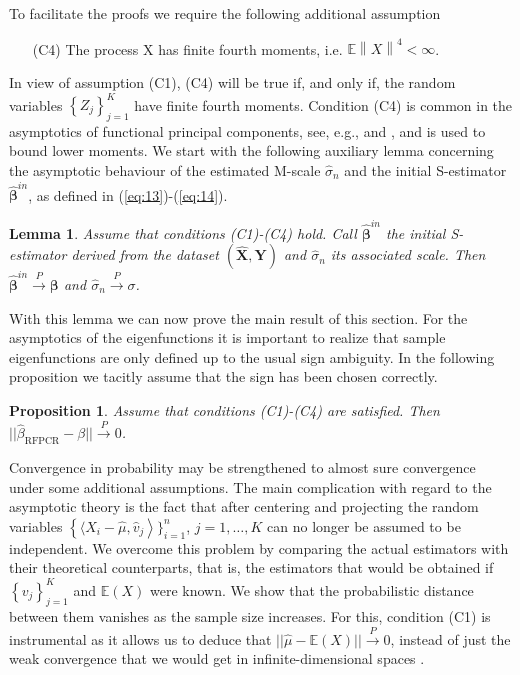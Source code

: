 \documentclass[11pt]{article}
\newtheorem{prop}{Proposition}[section]
\newtheorem{lem}{Lemma}[section]
\begin{document}
To facilitate the proofs we require the following additional assumption

\begin{itemize}
\item[(C4)] The process X has finite fourth moments, i.e. $\mathbb{E} \left\|X \right\|^4 < \infty$.
\end{itemize}
In view of assumption (C1), (C4) will be true if, and only if, the random variables $\left\{Z_j \right\}_{j=1}^K$ have finite fourth moments. Condition (C4) is common in the asymptotics of functional principal components, see, e.g., \citet[Chapter ~2]{horvath2012inference} and \cite{hall2007methodology}, and is used to bound lower moments. We start with the following auxiliary lemma concerning the asymptotic behaviour of the estimated M-scale $\widehat{\sigma}_n$ and the initial S-estimator $\boldsymbol{\widehat{\beta}}^{in}$, as defined in (\ref{eq:13})-(\ref{eq:14}).

\begin{lem}
Assume that conditions (C1)-(C4) hold. Call $\widehat{\boldsymbol{\beta}}^{in}$ the initial S-estimator derived from the dataset $ (\mathbf{\widehat{X}}, \mathbf{Y})$ and $\widehat{\sigma}_n$ its associated scale. Then $\widehat{\boldsymbol{\beta}}^{in} \xrightarrow{P} \boldsymbol{\beta}$ and $\widehat{\sigma}_n \xrightarrow{P} \sigma$.  
\end{lem}
With this lemma we can now prove the main result of this section. For the asymptotics of the eigenfunctions it is important to realize that sample eigenfunctions are only defined up to the usual sign ambiguity. In the following proposition we tacitly assume that the sign has been chosen correctly.

\begin{prop} Assume that conditions (C1)-(C4) are satisfied. Then $|| \widehat{\beta}_{{\scriptscriptstyle \text{RFPCR}}} - \beta || \xrightarrow{P} 0$.
\end{prop}
Convergence in probability may be strengthened to almost sure convergence under some additional assumptions. The main complication with regard to the asymptotic theory is the fact that after centering and projecting the random variables $\left\{ \langle X_i - \widehat{\mu}, \widehat{v}_j \right  \rangle \}_{i=1}^n$, $j=1, \ldots, K$ can no longer be assumed to be independent. We overcome this problem by comparing the actual estimators with their theoretical counterparts, that is, the estimators that would be obtained if $\left\{ v_j \right\}_{j=1}^K$ and $\mathbb{E}(X)$ were known. We show that the probabilistic distance between them vanishes as the sample size increases. For this, condition (C1) is instrumental as it allows us to deduce that $||\widehat{\mu}-\mathbb{E}(X) || \xrightarrow{P} 0$, instead of just the weak convergence that we would get in infinite-dimensional spaces \citep{gervini2008robust, sinova2018m}.
\end{document}
